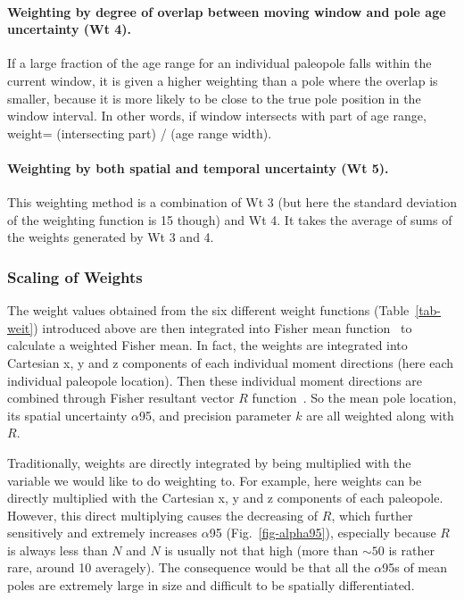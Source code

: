 \paragraph{Weighting by degree of overlap between moving window and pole age
uncertainty (Wt 4).} If a large fraction of the age range for an individual
paleopole falls within the current window, it is given a higher weighting than a
pole where the overlap is smaller, because it is more likely to be close to the
true pole position in the window interval. In other words, if window intersects
with part of age range, weight= (intersecting part) / (age range width).

\paragraph{Weighting by both spatial and temporal uncertainty (Wt 5).} This
weighting method is a combination of Wt 3 (but here the standard deviation of
the weighting function is 15 though) and Wt 4. It takes the average of sums of
the weights generated by Wt 3 and 4.

\subsubsection{Scaling of Weights}

The weight values obtained from the six different weight functions
(Table~\ref{tab-weit}) introduced above are then integrated into Fisher mean
function~\citep{F53} to calculate a weighted Fisher mean. In fact, the weights
are integrated into Cartesian x, y and z components of each individual moment
directions (here each individual paleopole location). Then these individual
moment directions are combined through Fisher resultant vector $R$
function~\citep[see][chap.~11]{T19}. So the mean pole location, its spatial
uncertainty $\alpha$95, and precision parameter $k$ are all weighted along with
$R$.

Traditionally, weights are directly integrated by being multiplied with the
variable we would like to do weighting to. For example, here weights can be
directly multiplied with the Cartesian x, y and z components of each paleopole.
However, this direct multiplying causes the decreasing of $R$, which further
sensitively and extremely increases $\alpha$95 (Fig.~\ref{fig-alpha95}),
especially because $R$ is always less than $N$ and $N$ is usually not that high
(more than ${\sim}50$ is rather rare, around 10 averagely). The consequence
would be that all the $\alpha$95s of mean poles are extremely large in size and
difficult to be spatially differentiated.

